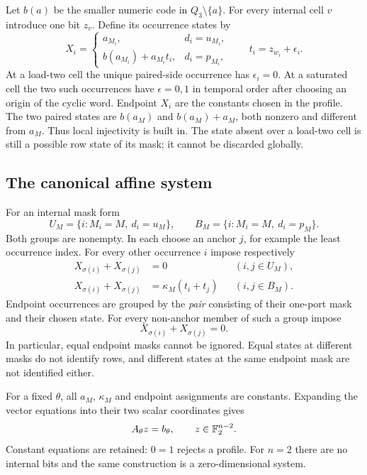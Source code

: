 Let $b(a)$ be the smaller numeric code in $Q_3\setminus\{a\}$.
For every internal cell $v$ introduce one bit $z_v$. Define its occurrence states by
\begin{equation}\label{eq:real-roles}
 X_i=\begin{cases}
 a_{M_i},&d_i=u_{M_i},\\
 b(a_{M_i})+a_{M_i}t_i,&d_i=p_{M_i},
 \end{cases}
 \qquad t_i=z_{w_i}+\epsilon_i.
\end{equation}
At a load-two cell the unique paired-side occurrence has $\epsilon_i=0$.
At a saturated cell the two such occurrences have $\epsilon=0,1$ in temporal
order after choosing an origin of the cyclic word. Endpoint $X_i$ are the constants
chosen in the profile. The two paired states are $b(a_M)$ and $b(a_M)+a_M$,
both nonzero and different from $a_M$. Thus local injectivity is built in.
The state absent over a load-two cell is still a possible row state of its mask;
it cannot be discarded globally.

\subsection{The canonical affine system}

For an internal mask form
\[
 U_M=\{i:M_i=M,\ d_i=u_M\},\qquad
 B_M=\{i:M_i=M,\ d_i=p_M\}.
\]
Both groups are nonempty. In each choose an anchor $j$, for example the least
occurrence index. For every other occurrence $i$ impose respectively
\begin{align}
 X_{\sigma(i)}+X_{\sigma(j)}&=0 &&(i,j\in U_M),\label{eq:real-U}\\
 X_{\sigma(i)}+X_{\sigma(j)}&=\kappa_M(t_i+t_j)
 &&(i,j\in B_M).\label{eq:real-B}
\end{align}
Endpoint occurrences are grouped by the \emph{pair} consisting of their one-port
mask and their chosen state. For every non-anchor member of such a group impose
\begin{equation}\label{eq:real-E}
 X_{\sigma(i)}+X_{\sigma(j)}=0.
\end{equation}
In particular, equal endpoint masks cannot be ignored. Equal states at different
masks do not identify rows, and different states at the same endpoint mask are not
identified either.

For a fixed $\theta$, all $a_M$, $\kappa_M$ and endpoint assignments are constants.
Expanding the vector equations into their two scalar coordinates gives
\begin{equation}\label{eq:real-system}
 A_\theta z=b_\theta,\qquad z\in\mathbb F_2^{n-2}.
\end{equation}
Constant equations are retained: $0=1$ rejects a profile. For $n=2$ there are no
internal bits and the same construction is a zero-dimensional system.

